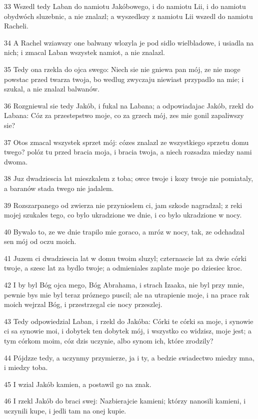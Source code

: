 \par 33 Wszedl tedy Laban do namiotu Jakóbowego, i do namiotu Lii, i do namiotu obydwóch sluzebnic, a nie znalazl; a wyszedlszy z namiotu Lii wszedl do namiotu Racheli.
\par 34 A Rachel wziawszy one balwany wlozyla je pod sidlo wielbladowe, i usiadla na nich; i zmacal Laban wszystek namiot, a nie znalazl.
\par 35 Tedy ona rzekla do ojca swego: Niech sie nie gniewa pan mój, ze nie moge powstac przed twarza twoja, bo wedlug zwyczaju niewiast przypadlo na mie; i szukal, a nie znalazl balwanów.
\par 36 Rozgniewal sie tedy Jakób, i fukal na Labana; a odpowiadajac Jakób, rzekl do Labana: Cóz za przestepstwo moje, co za grzech mój, zes mie gonil zapaliwszy sie?
\par 37 Otos zmacal wszystek sprzet mój: cózes znalazl ze wszystkiego sprzetu domu twego? polóz tu przed bracia moja, i bracia twoja, a niech rozsadza miedzy nami dwoma.
\par 38 Juz dwadziescia lat mieszkalem z toba; owce twoje i kozy twoje nie pomiataly, a baranów stada twego nie jadalem.
\par 39 Rozszarpanego od zwierza nie przynioslem ci, jam szkode nagradzal; z reki mojej szukales tego, co bylo ukradzione we dnie, i co bylo ukradzione w nocy.
\par 40 Bywalo to, ze we dnie trapilo mie goraco, a mróz w nocy, tak, ze odchadzal sen mój od oczu moich.
\par 41 Juzem ci dwadziescia lat w domu twoim sluzyl; czternascie lat za dwie córki twoje, a szesc lat za bydlo twoje; a odmieniales zaplate moje po dziesiec kroc.
\par 42 I by byl Bóg ojca mego, Bóg Abrahama, i strach Izaaka, nie byl przy mnie, pewnie bys mie byl teraz próznego puscil; ale na utrapienie moje, i na prace rak moich wejrzal Bóg, i przestrzegal cie nocy przeszlej.
\par 43 Tedy odpowiedzial Laban, i rzekl do Jakóba: Córki te córki sa moje, i synowie ci sa synowie moi, i dobytek ten dobytek mój, i wszystko co widzisz, moje jest; a tym córkom moim, cóz dzis uczynie, albo synom ich, które zrodzily?
\par 44 Pójdzze tedy, a uczynmy przymierze, ja i ty, a bedzie swiadectwo miedzy mna, i miedzy toba.
\par 45 I wzial Jakób kamien, a postawil go na znak.
\par 46 I rzekl Jakób do braci swej: Nazbierajcie kamieni; którzy nanosili kamieni, i uczynili kupe, i jedli tam na onej kupie.
